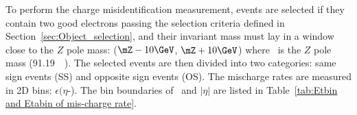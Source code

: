 

To perform the charge misidentification measurement, events are selected if they contain two good electrons passing the selection criteria defined in Section~\ref{sec:Object_selection}, and their invariant mass must lay in a window close to the $Z$ pole mass: ($\mZ - 10\GeV$,
$\mZ + 10\GeV$) where \mZ\ is the $Z$ pole mass (91.19~\GeV~\cite{PDG:2014}). The selected events are then divided into two categories: same
sign events (SS) and opposite sign events (OS). The mischarge rates
are measured in 2D bins: $\epsilon(\eta$-\pt). The bin boundaries of \pt\ and
$|\eta|$ are listed in Table~\ref{tab:Etbin and Etabin of mis-charge
  rate}.

